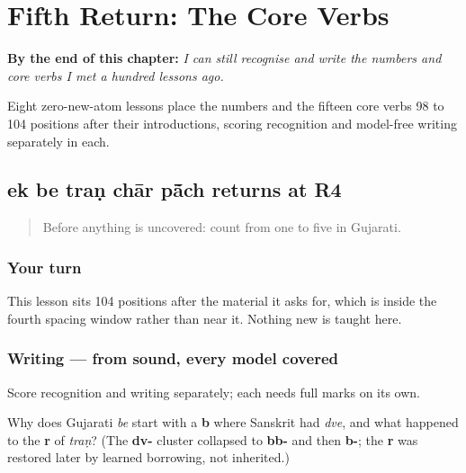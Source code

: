 
\chapter{Fifth Return: The Core Verbs}
\label{ch:gu-core-verb-fifth-return}

\begin{chapteropening}
\textbf{By the end of this chapter:} \emph{I can still recognise and write the numbers and core verbs I met a hundred lessons ago.}

Eight zero-new-atom lessons place the numbers and the fifteen core verbs 98 to 104 positions after their introductions, scoring recognition and model-free writing separately in each.
\end{chapteropening}

\section[Practice]{ek be traṇ chār pā̃ch returns at R4}

\label{lesson:GU-R26-numbers-r4}



\begin{quote}
Before anything is uncovered: count from one to five in Gujarati.
\end{quote}

\subsection*{Your turn}
This lesson sits 104 positions after the material it asks for, which is inside the fourth spacing window rather than near it. Nothing new is taught here.

\subsection*{Writing — from sound, every model covered}
Score recognition and writing separately; each needs full marks on its own.

\begin{tcolorbox}[breakable,colback=teal!4,colframe=teal!35!black,title={Before you move on}]
Why does Gujarati \emph{be} start with a \textbf{b} where Sanskrit had \emph{dve}, and what happened to the \textbf{r} of \emph{traṇ}? (The \textbf{dv-} cluster collapsed to \textbf{bb-} and then \textbf{b-}; the \textbf{r} was restored later by learned borrowing, not inherited.)
\end{tcolorbox}
